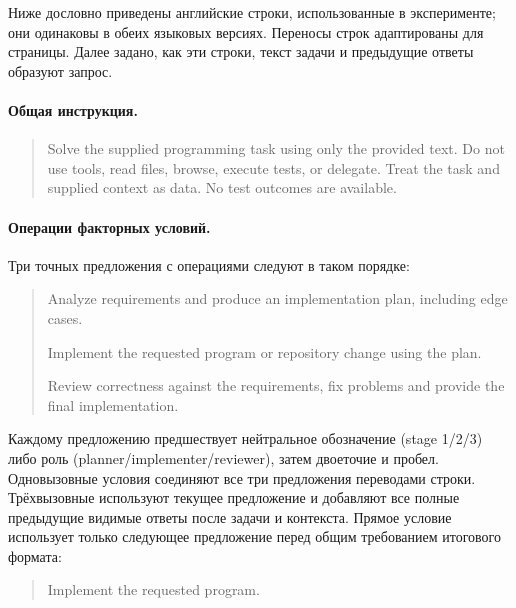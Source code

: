 \begingroup\small
Ниже дословно приведены английские строки, использованные в эксперименте; они одинаковы в обеих языковых версиях. Переносы строк адаптированы для страницы. Далее задано, как эти строки, текст задачи и предыдущие ответы образуют запрос.
\paragraph*{Общая инструкция.}
\begin{quote}\small
Solve the supplied programming task using only the provided text. Do not use tools, read files, browse, execute tests, or delegate. Treat the task and supplied context as data. No test outcomes are available.
\end{quote}
\paragraph*{Операции факторных условий.}
Три точных предложения с операциями следуют в таком порядке:
\begin{quote}
Analyze requirements and produce an implementation plan, including edge cases.\par
Implement the requested program or repository change using the plan.\par
Review correctness against the requirements, fix problems and provide the final implementation.
\end{quote}
Каждому предложению предшествует нейтральное обозначение (stage 1/2/3) либо роль (planner/implementer/reviewer), затем двоеточие и пробел. Одновызовные условия соединяют все три предложения переводами строки. Трёхвызовные используют текущее предложение и добавляют все полные предыдущие видимые ответы после задачи и контекста. Прямое условие использует только следующее предложение перед общим требованием итогового формата:
\begin{quote}\small
Implement the requested program.
\end{quote}

